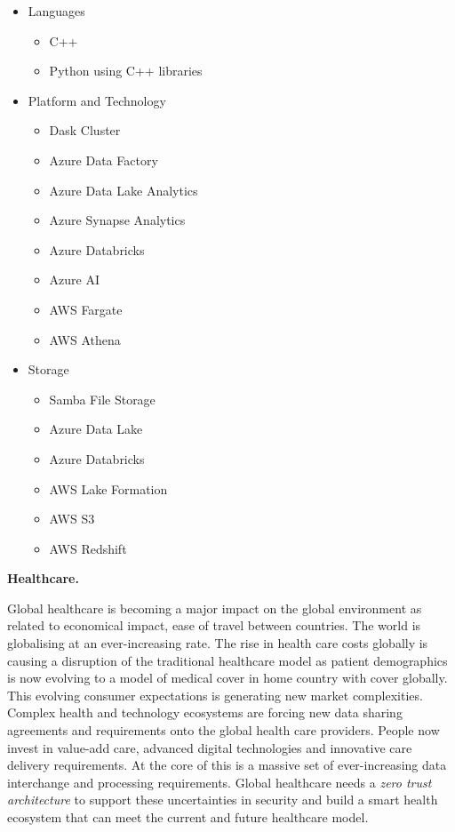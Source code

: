 \begin{Workpackage}{\thewpno}
\begin{Task}
\begin{itemize}
    \item Languages
        \begin{itemize}
            \item C++
            \item Python using C++ libraries
        \end{itemize}
    \item Platform and Technology
        \begin{itemize}
            \item Dask Cluster
            \item Azure Data Factory
            \item Azure Data Lake Analytics
            \item Azure Synapse Analytics
            \item Azure Databricks
            \item Azure AI
            \item AWS Fargate
            \item AWS Athena
        \end{itemize}
    \item Storage
        \begin{itemize}
            \item Samba File Storage
            \item Azure Data Lake
            \item Azure Databricks
            \item AWS Lake Formation
            \item AWS S3
            \item AWS Redshift
        \end{itemize}
\end{itemize}

\textbf{Healthcare.} 

Global healthcare is becoming a major impact on the global environment as related to economical impact, ease of travel between countries. The world is globalising at an ever-increasing rate. The rise in health care costs globally is causing a disruption of the traditional healthcare model as patient demographics is now evolving to a model of medical cover in home country with cover globally. This evolving consumer expectations is generating new market complexities. Complex health and technology ecosystems are forcing new data sharing agreements and requirements onto the global health care providers. People now invest in value-add care, advanced digital technologies and innovative care delivery requirements. At the core of this is a massive set of ever-increasing data interchange and processing requirements. Global healthcare needs a \emph{zero trust architecture} to support these uncertainties in security and build a smart health ecosystem that can meet the current and future healthcare model.


\end{Task}
\end{Workpackage}
